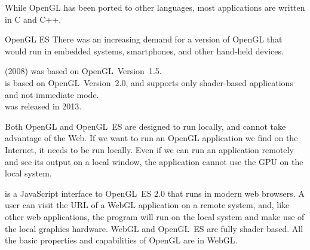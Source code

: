 \documentclass[\main/notes.tex]{subfiles}
\begin{document}
      While OpenGL has been ported to other languages,
      most applications are written in C and C++.

      \begin{definition}{OpenGL ES}
        There was an increasing demand for a version of OpenGL
        that would run in embedded systems, smartphones,
        and other hand-held devices.

         (2008) was based on OpenGL~Version~1.5.\\
         is based on OpenGL~Version~2.0,
        and supports only shader-based applications and not immediate mode.\\
         was released in 2013.
      \end{definition}

      Both OpenGL and OpenGL~ES are designed to run locally,
      and cannot take advantage of the Web.
      If we want to run an OpenGL application we find on the Internet,
      it needs to be run locally.
      Even if we can run an application remotely and see its output on a local window,
      the application cannot use the GPU on the local system.

       is a JavaScript interface to OpenGL~ES 2.0
      that runs in modern web browsers.
      A user can visit the URL of a WebGL application on a remote system,
      and, like other web applications,
      the program will run on the local system and make use of the local graphics hardware.
      WebGL and OpenGL~ES are fully shader based.
      All the basic properties and capabilities of OpenGL are in WebGL.

\end{document}

